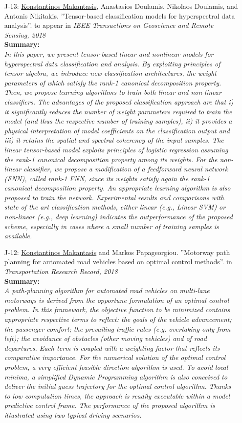 \documentclass[a4paper,10pt]{article}
\begin{document}
\begin{itemize}
	\item [J-13:]\underline{Konstantinos Makantasis}, Anastasios Doulamis, Nikolaos Doulamis, and Antonis Nikitakis. ''Tensor-based classification models for hyperspectral data analysis''. to appear in \textit{ IEEE Transactions on Geoscience and Remote Sensing, 2018}\\
	\textbf{Summary:}\\
	\textit{In this paper, we present tensor-based linear and nonlinear models for hyperspectral data classification and analysis. By exploiting principles of tensor algebra, we introduce new classification architectures, the weight parameters of which satisfy the rank-1 canonical decomposition property. Then, we propose learning algorithms to train both linear and non-linear classifiers. The advantages of the proposed classification approach are that i) it significantly reduces the number of weight parameters required to train the model (and thus the respective number of training samples), ii) it provides a physical interpretation of model coefficients on the classification output and iii) it retains the spatial and spectral coherency of the input samples. The linear tensor-based model exploits principles of logistic regression assuming the rank-1 canonical decomposition property among its weights. For the non-linear classifier, we propose a modification of a feedforward neural network (FNN), called rank-1 FNN, since its weights satisfy again the rank-1 canonical decomposition property. An appropriate learning algorithm is also proposed to train the network. Experimental results and comparisons with state of the art classification methods, either linear (e.g., Linear SVM) or non-linear (e.g., deep learning) indicates the outperformance of the proposed scheme, especially in cases where a small number of training samples is available.}	
	
	\item [J-12:]\underline{Konstantinos Makantasis} and Markos Papageorgiou. ''Motorway path planning for automated road vehicles based on optimal control methods''. in \textit{Transportation Research Record, 2018}\\
	\textbf{Summary:}\\
	\textit{A path-planning algorithm for automated road vehicles on multi-lane motorways is derived from the opportune formulation of an optimal control problem. In this framework, the objective function to be minimized contains appropriate respective terms to reflect: the goals of the vehicle advancement; the passenger comfort; the prevailing traffic rules (e.g. overtaking only from left); the avoidance of obstacles (other moving vehicles) and of road departures. Each term is coupled with a weighting factor that reflects its comparative importance. For the numerical solution of the optimal control problem, a very efficient feasible direction algorithm is used. To avoid local minima, a simplified Dynamic Programming algorithm is also conceived to deliver the initial guess trajectory for the optimal control algorithm. Thanks to low computation times, the approach is readily executable within a model predictive control frame. The performance of the proposed algorithm is illustrated using two typical driving scenarios.}
	

\end{itemize}
\end{document}
